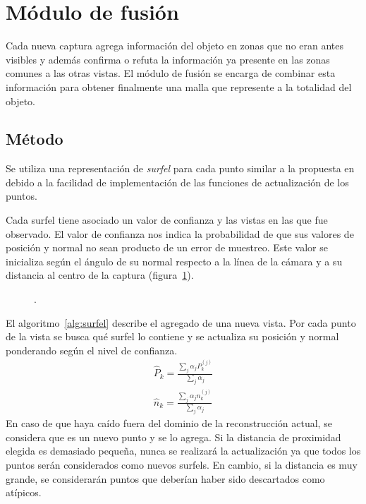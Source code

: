\section{Módulo de fusión}
	Cada nueva captura agrega información del objeto en zonas que no eran antes visibles
	y además confirma o refuta la información ya presente en las zonas comunes a las otras vistas.
	El módulo de fusión se encarga de combinar esta información para obtener
	finalmente una malla que represente a la totalidad del objeto.



	\subsection{Método}
	Se utiliza una representación de \emph{surfel} para cada punto similar a la propuesta en \cite{5457479} %
	debido a la facilidad de implementación de las funciones de actualización de los puntos.

	Cada surfel tiene asociado un valor de confianza y las vistas en las que
	fue observado.  El valor de confianza nos indica la probabilidad de que sus
	valores de posición y normal no sean producto de un error de muestreo.
	Este valor se inicializa según el ángulo de su normal respecto a la línea
	de la cámara y a su distancia al centro de la captura (figura~\ref{fig:confianza_surfel}).

	\begin{figure}
		\caption{\label{fig:confianza_surfel}.}
	\end{figure}


	El algoritmo~\ref{alg:surfel} describe el agregado de una nueva vista.
	Por cada punto de la vista se busca qué surfel lo contiene y se actualiza
	su posición y normal ponderando según el nivel de confianza.
	\begin{eqnarray*}
		\hat{P}_k = \frac{\sum_{j} \alpha_j P^{(j)}_k}{\sum_{j} \alpha_j} \\
		\hat{n}_k = \frac{\sum_{j} \alpha_j n^{(j)}_k}{\sum_{j} \alpha_j}
	\end{eqnarray*}
	En caso de que haya caído fuera del dominio de la reconstrucción actual, se
	considera que es un nuevo punto y se lo agrega.
	Si la distancia de proximidad elegida es demasiado pequeña,
	nunca se realizará la actualización ya que todos los puntos serán considerados como nuevos surfels.
	En cambio, si la distancia es muy grande, se considerarán puntos
	que deberían haber sido descartados como atípicos.


